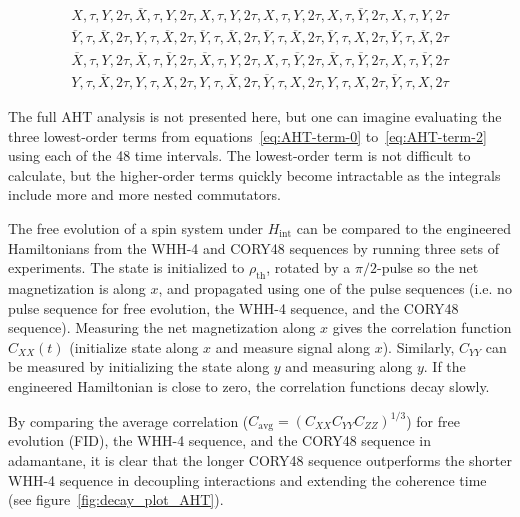 \begin{equation}\label{eq:CORY48}
\begin{aligned}
    X, \tau, Y, 2\tau, \overline{X}, \tau, Y, 2\tau, X, \tau, Y, 2\tau,
    X, \tau, Y, 2\tau, X, \tau, \overline{Y}, 2\tau, X, \tau, Y, 2\tau \\
    \overline{Y}, \tau, \overline{X}, 2\tau, Y, \tau, \overline{X}, 2\tau,
    \overline{Y}, \tau, \overline{X}, 2\tau, \overline{Y}, \tau, \overline{X},
    2\tau, \overline{Y}, \tau, X, 2\tau, \overline{Y}, \tau, \overline{X},
    2\tau \\
    \overline{X}, \tau, Y, 2\tau, \overline{X}, \tau, \overline{Y}, 2\tau,
    \overline{X}, \tau, Y, 2\tau, X, \tau, \overline{Y}, 2\tau, \overline{X},
    \tau, \overline{Y}, 2\tau, X, \tau, \overline{Y}, 2\tau \\
    Y, \tau, \overline{X}, 2\tau, Y, \tau, X, 2\tau, Y, \tau, \overline{X}, 2\tau, \overline{Y}, \tau, X, 2\tau, Y, \tau, X, 2\tau, \overline{Y}, \tau, X, 2\tau
\end{aligned}
\end{equation}


The full AHT analysis is not presented here, but one can imagine evaluating the three lowest-order terms from equations~\ref{eq:AHT-term-0} to~\ref{eq:AHT-term-2} using each of the 48 time intervals. The lowest-order term is not difficult to calculate, but the higher-order terms quickly become intractable as the integrals include more and more nested commutators.

The free evolution of a spin system under $H_{\text{int}}$ can be compared to the engineered Hamiltonians from the WHH-4 and CORY48 sequences by running three sets of experiments. The state is initialized to $\rho_\text{th}$, rotated by a $\pi/2$-pulse so the net magnetization is along $x$, and propagated using one of the pulse sequences (i.e. no pulse sequence for free evolution, the WHH-4 sequence, and the CORY48 sequence). Measuring the net magnetization along $x$ gives the correlation function $C_{XX}(t)$ (initialize state along $x$ and measure signal along $x$). Similarly, $C_{YY}$ can be measured by initializing the state along $y$ and measuring along $y$.
If the engineered Hamiltonian is close to zero, the correlation functions decay slowly.

By comparing the average correlation ($C_{\text{avg}} = (C_{XX}C_{YY}C_{ZZ})^{1/3}$) for free evolution (FID), the WHH-4 sequence, and the CORY48 sequence in adamantane, it is clear that the longer CORY48 sequence outperforms the shorter WHH-4 sequence in decoupling interactions and extending the coherence time (see figure~\ref{fig:decay_plot_AHT}).


